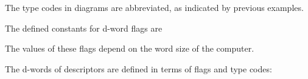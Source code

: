 The type codes in diagrams are abbreviated, as indicated by previous examples.


The defined constants for d-word flags are


The values of these flags depend on the word size of the computer.


The d-words of descriptors are defined in terms of flags and type codes:

